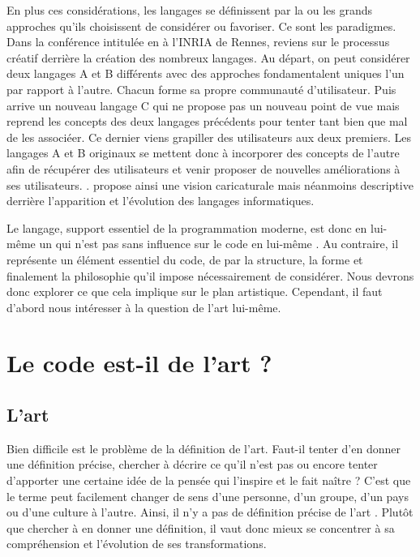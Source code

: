\documentclass[12pt]{article} %
\begin{document}
En plus ces considérations, les langages se définissent par la ou les grands approches qu'ils choisissent de considérer ou favoriser. Ce sont les paradigmes. Dans la conférence intitulée  en  à l'INRIA de Rennes, \citeauthor{GerardBerry2015} reviens sur le processus créatif derrière la création des nombreux langages. Au départ, on peut considérer deux langages A et B différents avec des approches fondamentalent uniques l'un par rapport à l'autre. Chacun forme sa propre communauté d'utilisateur. Puis arrive un nouveau langage C qui ne propose pas un nouveau point de vue mais reprend les concepts des deux langages précédents pour tenter tant bien que mal de les associéer. Ce dernier viens grapiller des utilisateurs aux deux premiers. Les langages A et B originaux se mettent donc à incorporer des concepts de l'autre afin de récupérer des utilisateurs et venir proposer de nouvelles améliorations à ses utilisateurs. \cite{GerardBerry2015}. \citeauthor{GerardBerry2015} propose ainsi une vision caricaturale mais néanmoins descriptive derrière l'apparition et l'évolution des langages informatiques.

Le langage, support essentiel de la programmation moderne, est donc en lui-même un  \cite{GerardBerry2015} qui n'est pas sans influence sur le code en lui-même \cite{Dijkstra1976}. Au contraire, il représente un élément essentiel du code, de par la structure, la forme et finalement la philosophie qu'il impose nécessairement de considérer. Nous devrons donc explorer ce que cela implique sur le plan artistique. Cependant, il faut d'abord nous intéresser à la question de l'art lui-même.

\section{Le code est-il de l'art ?}

\subsection{L'art}
Bien difficile est le problème de la définition de l'art. Faut-il tenter d'en donner une définition précise, chercher à décrire ce qu'il n'est pas ou encore tenter d'apporter une certaine idée de la pensée qui l'inspire et le fait naître ? C'est que le terme peut facilement changer de sens d'une personne, d'un groupe, d'un pays ou d'une culture à l'autre. Ainsi, il n'y a pas de définition précise de l'art \cite{SDavies1991}. Plutôt que chercher à en donner une définition, il vaut donc mieux se concentrer à sa compréhension et l'évolution de ses transformations. 
\end{document}
